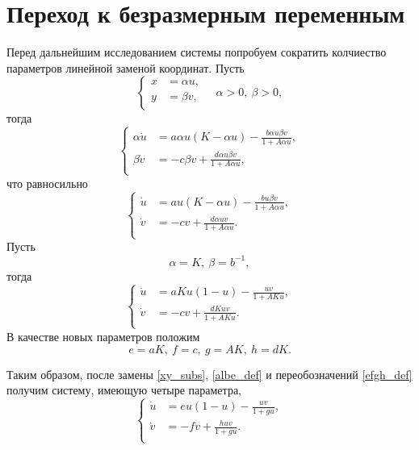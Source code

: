\documentclass[oneside,final,12pt]{article}
\theoremstyle{plain}
\theoremstyle{remark}
\theoremstyle{definition}
\theoremstyle{plain}
\begin{document}
	\section{Переход к безразмерным переменным}
		{\newcommand*\ag{\alpha}
		\newcommand*\bg{\beta}

		Перед дальнейшим исследованием системы попробуем сократить колчиество параметров линейной заменой координат. Пусть
		\begin{equation}\label{xy_subs}
			\left\{ \begin{aligned}
				x & = \ag u,\\
				y & = \bg v,\\
			\end{aligned}\right. 
			\quad \ag > 0, \: \bg > 0,
		\end{equation}
тогда
		\[\left\{ \begin{aligned}
			\ag\dot u & = a\ag u(K-\ag u) - \frac{b\ag u \bg v}{1+A \ag u},\\
			\bg\dot v & = -c\bg v + \frac{d \ag u \bg v}{1+A \ag u},	\\
		\end{aligned}\right. \]
что равносильно
		\[\left\{ \begin{aligned}
			\dot u & = a u(K-\ag u) - \frac{b u \bg v}{1+A \ag u},\\
			\dot v & = -c v + \frac{d \ag u v}{1+A \ag u}.	\\
		\end{aligned}\right. \]
Пусть 
		\begin{equation}\label{albe_def}
			\ag = K,\: \bg = b^{-1},
		\end{equation}
 тогда
		\[\left\{ \begin{aligned}
			\dot u & = aKu(1-u) - \frac{uv}{1+AK u},\\
			\dot v & = -cv + \frac{dK u v}{1+AK u}.	\\
		\end{aligned}\right. \]
В качестве новых параметров положим
		\begin{equation}\label{efgh_def}
			e = aK,\: f = c,\: g = AK,\: h = dK.
		\end{equation}

	Таким образом, после замены \eqref{xy_subs}, \eqref{albe_def} и переобозначений \eqref{efgh_def} получим систему, имеющую четыре параметра,
		\begin{equation}\label{odu_subs}
			\left\{ \begin{aligned}
				\dot u & = eu(1-u) - \frac{uv}{1+g u},\\
				\dot v & = -fv + \frac{h u v}{1+g u}.	\\
			\end{aligned}\right.
		\end{equation}

}
\end{document}
